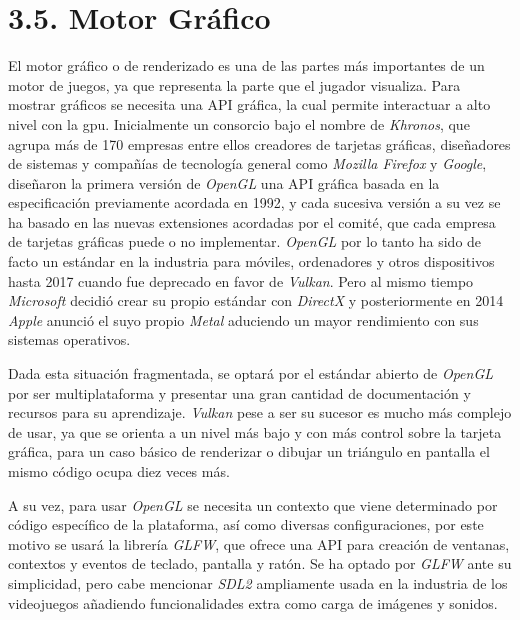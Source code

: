 \section*{3.5. Motor Gráfico}\label{sec:graphics_engine}

El motor gráfico o de renderizado es una de las partes más importantes de un motor de juegos, ya que representa la parte
que el jugador visualiza. Para mostrar gráficos se necesita una API gráfica, la cual permite interactuar a alto nivel
con la \gls{gpu}. Inicialmente un consorcio bajo el nombre de \textit{Khronos}\cite{khronos}, que agrupa más de 170 empresas entre ellos creadores de
tarjetas gráficas, diseñadores de sistemas y compañías de tecnología general como \textit{Mozilla Firefox} y \textit{Google}, diseñaron la primera versión de
\textit{OpenGL}\cite{opengl} una API gráfica basada en la especificación previamente acordada en 1992, y cada sucesiva versión a su vez se ha basado
en las nuevas extensiones acordadas por el comité, que cada empresa de tarjetas gráficas puede o no implementar\cite{opengl-wiki}. 
\textit{OpenGL} por lo tanto ha sido de facto un estándar en la industria para móviles, ordenadores y otros dispositivos hasta 2017 cuando fue deprecado en favor de \textit{Vulkan}\cite{vulkan}.
Pero al mismo tiempo \textit{Microsoft} decidió crear su propio estándar con \textit{DirectX}\cite{direct11} y posteriormente en 2014 \textit{Apple} anunció el suyo propio \textit{Metal}\cite{metal} aduciendo un
mayor rendimiento con sus sistemas operativos\cite{apis-tale}.

Dada esta situación fragmentada, se optará por el estándar abierto de \textit{OpenGL} por ser multiplataforma y presentar una gran
cantidad de documentación y recursos para su aprendizaje\cite{learn-opengl}\cite{guide-to-modern-opengl}. \textit{Vulkan} pese a ser
su sucesor es mucho más complejo de usar, ya que se orienta a un nivel más bajo y con más control sobre la tarjeta gráfica\cite{comparing-graphics-apis},
para un caso básico de renderizar o dibujar un triángulo en pantalla el mismo código ocupa diez veces más\cite{hello-triangle}.

A su vez, para usar \textit{OpenGL} se necesita un contexto que viene determinado por código específico de la plataforma, así como
diversas configuraciones, por este motivo se usará la librería \textit{GLFW}\cite{glfw}, que ofrece una API para creación de ventanas,
contextos y eventos de teclado, pantalla y ratón. Se ha optado por \textit{GLFW} ante su simplicidad, pero cabe mencionar \textit{SDL2}\cite{sdl2}\cite{learn-sdl}
ampliamente usada en la industria de los videojuegos añadiendo funcionalidades extra como carga de imágenes y sonidos\cite{opengl-toolkits}.

